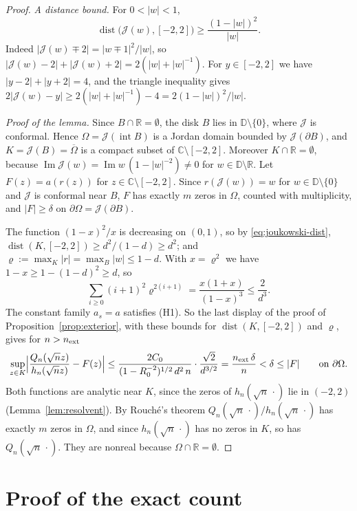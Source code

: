 \documentclass[11pt]{amsart}
\theoremstyle{definition}
\theoremstyle{remark}
\numberwithin{equation}{section}
\newcommand{\C}{\mathbb{C}}
\newcommand{\R}{\mathbb{R}}
\newcommand{\D}{\mathbb{D}}
\DeclareMathOperator{\im}{Im}
\DeclareMathOperator{\dist}{dist}
\begin{document}
\begin{proof}
\emph{A distance bound.} For $0<|w|<1$,
\begin{equation}\label{eq:joukowski-dist}
\dist\bigl(\mathcal J(w),[-2,2]\bigr)\ge\frac{(1-|w|)^2}{|w|}.
\end{equation}
Indeed $|\mathcal J(w)\mp2|=|w\mp1|^2/|w|$, so $|\mathcal J(w)-2|+|\mathcal J(w)+2|=2(|w|+|w|^{-1})$. For $y\in[-2,2]$ we have $|y-2|+|y+2|=4$, and the triangle inequality gives $2|\mathcal J(w)-y|\ge2(|w|+|w|^{-1})-4=2(1-|w|)^2/|w|$.

\emph{Proof of the lemma.} Since $B\cap\R=\emptyset$, the disk $B$ lies in $\D\setminus\{0\}$, where $\mathcal J$ is conformal. Hence $\Omega=\mathcal J(\operatorname{int}B)$ is a Jordan domain bounded by $\mathcal J(\partial B)$, and $K=\mathcal J(B)=\overline\Omega$ is a compact subset of $\C\setminus[-2,2]$. Moreover $K\cap\R=\emptyset$, because $\im \mathcal J(w)=\im w\,(1-|w|^{-2})\ne0$ for $w\in\D\setminus\R$. Let $F(z)=a(r(z))$ for $z\in\C\setminus[-2,2]$. Since $r(\mathcal J(w))=w$ for $w\in\D\setminus\{0\}$ and $\mathcal J$ is conformal near $B$, $F$ has exactly $m$ zeros in $\Omega$, counted with multiplicity, and $|F|\ge\delta$ on $\partial\Omega=\mathcal J(\partial B)$.

The function $(1-x)^2/x$ is decreasing on $(0,1)$, so by \eqref{eq:joukowski-dist}, $\dist(K,[-2,2])\ge d^2/(1-d)\ge d^2$; and $\varrho:=\max_K|r|=\max_B|w|\le1-d$. With $x=\varrho^2$ we have $1-x\ge1-(1-d)^2\ge d$, so
\[
\sum_{i\ge0}(i+1)^2\varrho^{2(i+1)}=\frac{x(1+x)}{(1-x)^3}\le\frac{2}{d^{3}}.
\]
The constant family $a_s=a$ satisfies (H1). So the last display of the proof of Proposition~\ref{prop:exterior}, with these bounds for $\dist(K,[-2,2])$ and $\varrho$, gives for $n>n_{\rm ext}$
\[
\sup_{z\in K}\Bigl|\frac{Q_n(\sqrt nz)}{h_n(\sqrt nz)}-F(z)\Bigr|\le\frac{2C_0}{(1-R_0^{-2})^{1/2}\,d^2\,n}\cdot\frac{\sqrt2}{d^{3/2}}=\frac{n_{\rm ext}\,\delta}{n}<\delta\le|F|\qquad\text{on }\partial\Omega .
\]
Both functions are analytic near $K$, since the zeros of $h_n(\sqrt n\,\cdot)$ lie in $(-2,2)$ (Lemma~\ref{lem:resolvent}). By Rouch\'e's theorem $Q_n(\sqrt n\,\cdot)/h_n(\sqrt n\,\cdot)$ has exactly $m$ zeros in $\Omega$, and since $h_n(\sqrt n\,\cdot)$ has no zeros in $K$, so has $Q_n(\sqrt n\,\cdot)$. They are nonreal because $\Omega\cap\R=\emptyset$.
\end{proof}

\section{Proof of the exact count}\label{sec:proof}
\end{document}
